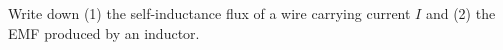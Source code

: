 

\vspace*{\fill}
\centering

Write down (1) the self-inductance flux of a wire carrying current $I$ and (2) the EMF produced by an inductor.

\centering
\vspace*{\fill}

